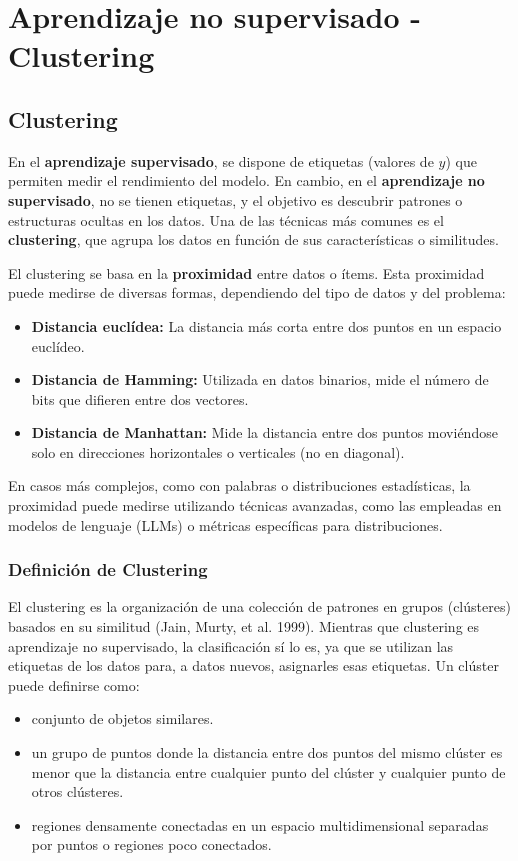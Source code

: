 \chapter{Aprendizaje no supervisado - Clustering}
\section{Clustering}
En el \textbf{aprendizaje supervisado}, se dispone de etiquetas (valores de $y$) que permiten medir el rendimiento del modelo. En cambio, en el \textbf{aprendizaje no supervisado}, no se tienen etiquetas, y el objetivo es descubrir patrones o estructuras ocultas en los datos. Una de las técnicas más comunes es el \textbf{clustering}, que agrupa los datos en función de sus características o similitudes.

El clustering se basa en la \textbf{proximidad} entre datos o ítems. Esta proximidad puede medirse de diversas formas, dependiendo del tipo de datos y del problema:
\begin{itemize}
\item \textbf{Distancia euclídea:} La distancia más corta entre dos puntos en un espacio euclídeo.
\item \textbf{Distancia de Hamming:} Utilizada en datos binarios, mide el número de bits que difieren entre dos vectores.
\item \textbf{Distancia de Manhattan:} Mide la distancia entre dos puntos moviéndose solo en direcciones horizontales o verticales (no en diagonal).
\end{itemize}

En casos más complejos, como con palabras o distribuciones estadísticas, la proximidad puede medirse utilizando técnicas avanzadas, como las empleadas en modelos de lenguaje (LLMs) o métricas específicas para distribuciones.

\subsection{Definición de Clustering}
El clustering es la organización de una colección de patrones en grupos (clústeres) basados en su similitud (Jain, Murty, et al. 1999). Mientras que clustering es aprendizaje no supervisado, la clasificación sí lo es, ya que se utilizan las etiquetas de los datos para, a datos nuevos, asignarles esas etiquetas. Un clúster puede definirse como:
\begin{itemize}
\item conjunto de objetos similares.
\item un grupo de puntos donde la distancia entre dos puntos del mismo clúster es menor que la distancia entre cualquier punto del clúster y cualquier punto de otros clústeres.
\item regiones densamente conectadas en un espacio multidimensional separadas por puntos o regiones poco conectados.
\end{itemize}

